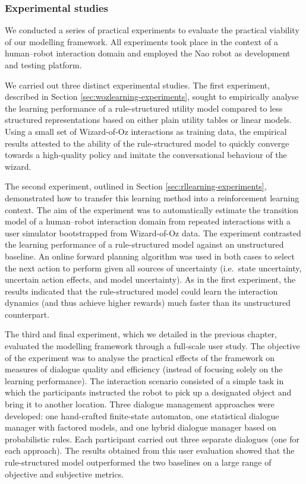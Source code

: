 \subsubsection*{Experimental studies}

We conducted a series of practical experiments to evaluate the practical viability of our modelling framework. All experiments took place in the context of a human--robot interaction domain and employed the Nao robot as development and testing platform. 

We carried out three distinct experimental studies.  The first experiment, described in Section \ref{sec:wozlearning-experiments}, sought to empirically analyse the learning performance of a rule-structured utility model compared to less structured representations based on either plain utility tables or linear models.  Using a small set of Wizard-of-Oz interactions as training data, the empirical results attested to the ability of the rule-structured model to quickly converge towards a high-quality policy and imitate the conversational behaviour of the wizard.

The second experiment, outlined in Section \ref{sec:rllearning-experiments}, demonstrated how to transfer this learning method into a reinforcement learning context.  The aim of the experiment was to automatically estimate the transition model of a human--robot interaction domain from repeated interactions with a user simulator bootstrapped from Wizard-of-Oz data. The experiment contrasted the learning performance of a rule-structured model against an unstructured baseline.  An online forward planning algorithm was used in both cases to select the next action to perform given all sources of uncertainty (i.e.\ state uncertainty, uncertain action effects, and model uncertainty). As in the first experiment, the results indicated that the rule-structured model could learn the interaction dynamics (and thus achieve higher rewards) much faster than its unstructured counterpart.

The third and final experiment, which we detailed in the previous chapter, evaluated the modelling framework through a full-scale user study.   The objective of the experiment was to analyse the practical effects of the framework on measures of dialogue quality and efficiency (instead of focusing solely on the learning performance). The interaction scenario consisted of a simple task in which the participants instructed the robot to pick up a designated object and bring it to another location. Three dialogue management approaches were developed: one hand-crafted finite-state automaton, one statistical dialogue manager with factored models, and one hybrid dialogue manager based on probabilistic rules.  Each participant carried out three separate dialogues (one for each approach).  The results obtained from this user evaluation showed that the rule-structured model outperformed the two baselines on a large range of objective and subjective metrics.

